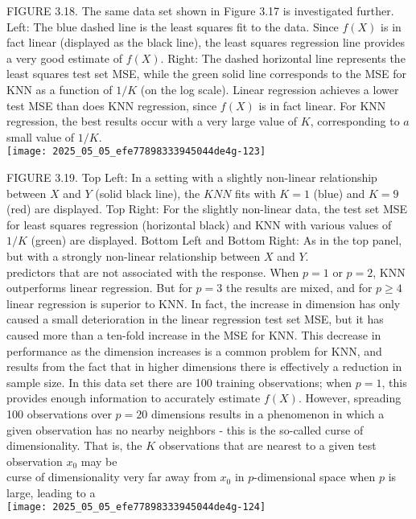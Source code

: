 \documentclass[10pt]{article}
\begin{document}
FIGURE 3.18. The same data set shown in Figure 3.17 is investigated further. Left: The blue dashed line is the least squares fit to the data. Since $f(X)$ is in fact linear (displayed as the black line), the least squares regression line provides a very good estimate of $f(X)$. Right: The dashed horizontal line represents the least squares test set MSE, while the green solid line corresponds to the MSE for KNN as a function of $1 / K$ (on the log scale). Linear regression achieves a lower test MSE than does KNN regression, since $f(X)$ is in fact linear. For KNN regression, the best results occur with a very large value of $K$, corresponding to $a$ small value of $1 / 
K$.\\
\texttt{[image: 2025\_05\_05\_efe77898333945044de4g-123]}

FIGURE 3.19. Top Left: In a setting with a slightly non-linear relationship between $X$ and $Y$ (solid black line), the $K N N$ fits with $K=1$ (blue) and $K=9$ (red) are displayed. Top Right: For the slightly non-linear data, the test set MSE for least squares regression (horizontal black) and KNN with various values of $1 / K$ (green) are displayed. Bottom Left and Bottom Right: As in the top panel, but with a strongly non-linear relationship between $X$ and $Y$.\\
predictors that are not associated with the response. When $p=1$ or $p=2$, KNN outperforms linear regression. But for $p=3$ the results are mixed, and for $p \geq 4$ linear regression is superior to KNN. In fact, the increase in dimension has only caused a small deterioration in the linear regression test set MSE, but it has caused more than a ten-fold increase in the MSE for KNN. This decrease in performance as the dimension increases is a common problem for KNN, and results from the fact that in higher dimensions there is effectively a reduction in sample size. In this data set there are 100 training observations; when $p=1$, this provides enough information to accurately estimate $f(X)$. However, spreading 100 observations over $p=20$ dimensions results in a phenomenon in which a given observation has no nearby neighbors - this is the so-called curse of dimensionality. That is, the $K$ observations that are nearest to a given test observation $x_{0}$ may be\\
curse of dimensionality very far away from $x_{0}$ in $p$-dimensional space when $p$ is large, leading to a\\
\texttt{[image: 2025\_05\_05\_efe77898333945044de4g-124]}
\end{document}
